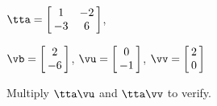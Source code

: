 {$\tta = \left[\hskip -3pt \begin{array}{cc} 1&-2\\   -3&6 \end{array}\hskip -3pt \right] $, 

$\vb=\left[\hskip -3pt \begin{array}{c} 2\\   -6 \end{array}\hskip -3pt \right] $, 
$\vu = \left[\hskip -3pt \begin{array}{c} 0\\ -1 \end{array}\hskip -3pt \right]$, $\vv = \left[\hskip -3pt \begin{array}{c} 2\\ 0 \end{array}\hskip -3pt \right]$ }
{Multiply $\tta\vu$ and $\tta\vv$ to verify.}




